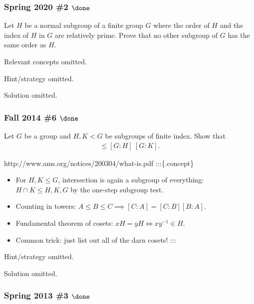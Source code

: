 \hypertarget{spring-2020-2-done}{%
\subsubsection{\texorpdfstring{Spring 2020 \#2
\(\done\)}{Spring 2020 \#2 \textbackslash done}}\label{spring-2020-2-done}}

Let \(H\) be a normal subgroup of a finite group \(G\) where the order
of \(H\) and the index of \(H\) in \(G\) are relatively prime. Prove
that no other subgroup of \(G\) has the same order as \(H\).

Relevant concepts omitted.

Hint/strategy omitted.

Solution omitted.

\hypertarget{fall-2014-6-done}{%
\subsubsection{\texorpdfstring{Fall 2014 \#6
\(\done\)}{Fall 2014 \#6 \textbackslash done}}\label{fall-2014-6-done}}

Let \(G\) be a group and \(H, K < G\) be subgroups of finite index. Show
that
\begin{align*}
[G: H\cap K] \leq [G: H] ~ [G:K]
.\end{align*}

http://www.ams.org/notices/200304/what-is.pdf :::\{.concept\} \envlist

\begin{itemize}
\tightlist
\item
  For \(H, K\leq G\), intersection is again a subgroup of everything:
  \(H\cap K \leq H, K, G\) by the one-step subgroup test.
\item
  Counting in towers: \(A\leq B \leq C \implies [C:A] = [C:B][B:A]\).
\item
  Fundamental theorem of cosets: \(xH = yH \iff xy^{-1}\in H\).
\item
  Common trick: just list out all of the darn cosets! :::
\end{itemize}

Hint/strategy omitted.

Solution omitted.

\hypertarget{spring-2013-3-done}{%
\subsubsection{\texorpdfstring{Spring 2013 \#3
\(\done\)}{Spring 2013 \#3 \textbackslash done}}\label{spring-2013-3-done}}

